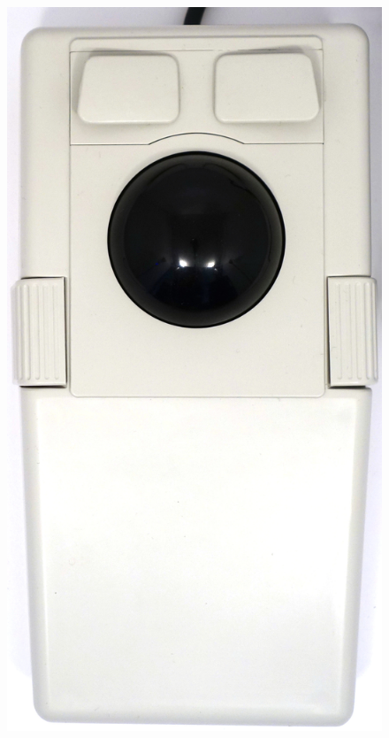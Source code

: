 \documentclass[11pt, a4paper]{article}
\begin{document}
\begin{figure}[h]
    \centering
    \includegraphics[scale=0.35]{1993_evergreen_diamond_xl_trackball/top_30.jpg}

\end{figure}
\end{document}

